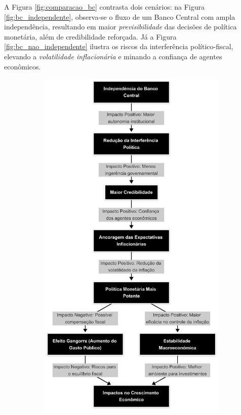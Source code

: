 \documentclass[a4paper,12pt]{article}[abnt2]
\begin{document}
A Figura \ref{fig:comparacao_bc} contrasta dois cenários: na Figura \ref{fig:bc_independente}, observa-se o fluxo de um Banco Central com ampla independência, resultando em maior \emph{previsibilidade} das decisões de política monetária, além de credibilidade reforçada. Já a Figura \ref{fig:bc_nao_independente} ilustra os riscos da interferência político-fiscal, elevando a \emph{volatilidade inflacionária} e minando a confiança de agentes econômicos.

\begin{figure}[H]
    \centering
    \begin{subfigure}[b]{0.45\textwidth}
        \centering
        \includegraphics[width=\linewidth]{Imagens/m2i1.jpg}

\end{subfigure}
\end{figure}
\end{document}
